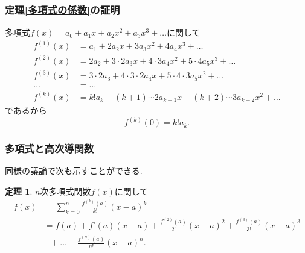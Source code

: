 \documentclass[dvipdfmx,cjk,10.2pt]{beamer}
\theoremstyle{definition}
\newtheorem{Thm}{定理}[section]
\begin{document}
\begin{frame}
\frametitle{定理\ref{多項式の係数}の証明}


多項式$f(x)=a_0+a_1x+a_2x^2+a_3x^3+\dots$に関して
\begin{align*}
f^{(1)}(x) &=a_1+2a_2x+3a_3x^2+4a_4x^3+\dots \\
f^{(2)}(x) &=2a_2+3\cdot 2 a_3x+4\cdot 3 a_4x^2+5\cdot 4 a_5 x^3+\dots \\
f^{(3)}(x) &=3\cdot 2 a_3+4\cdot 3 \cdot 2 a_4x+5\cdot 4 \cdot 3 a_5 x^2+\dots \\
\dots & = \dots \\ 
f^{(k)}(x) &= k! a_k +(k+1)\cdots 2a_{k+1}x+(k+2)\cdots 3a_{k+2}x^2+\dots
\end{align*}
であるから
$$
f^{(k)}(0)=k! a_k.  
$$

\end{frame}








\begin{frame}
\frametitle{多項式と高次導関数}

同様の議論で次も示すことができる. 

\begin{Thm} \label{poly_exp}
$n$次多項式関数$f(x)$に関して
\begin{align*}
f(x) & = \sum_{k=0}^n\frac{f^{(k)}(a)}{k!}(x-a)^k \\
& =  f(a)+ f'(a)(x-a) + \frac{f^{(2)}(a)}{2!}(x-a)^2  + \frac{f^{(3)}(a)}{3!}(x-a)^3 \\
& \ \ \ + \dots + \frac{f^{(n)}(a)}{n!}(x-a)^n. 
\end{align*}
\end{Thm}


\end{frame}


\end{document}

